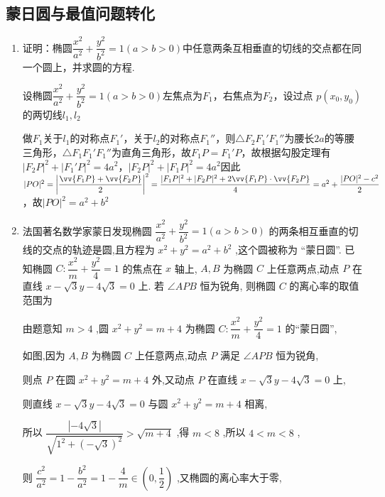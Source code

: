 \subsection*{蒙日圆与最值问题转化}
\begin{enumerate}
    \item 证明：椭圆$\dfrac{x^2}{a^2}+\dfrac{y^2}{b^2} = 1 (a>b>0)$中任意两条互相垂直的切线的交点都在同一个圆上，并求圆的方程.
    \begin{jieda}
        设椭圆$\dfrac{x^2}{a^2}+\dfrac{y^2}{b^2} = 1 (a>b>0)$左焦点为$F_1$，右焦点为$F_2$，设过点 $p\left( {{x}_{0},{y}_{0}}\right)$ 的两切线$l_1, l_2$

        做$F_1$关于$l_1$的对称点$F_1'$，关于$l_2$的对称点$F_1''$，则$\triangle F_2F_1'F_1''$为腰长$2a$的等腰三角形，$\triangle F_1F_1'F_1''$为直角三角形，故$F_1P = F_1'P$，故根据勾股定理有$|F_2P|^2 + |F_1'P|^2 = 4a^2$，$|F_2P|^2 + |F_1P|^2 = 4a^2$因此$|PO|^2 = \left|\dfrac{\vv{F_1P}+\vv{F_2P}}{2}\right|^2 = \dfrac{|F_1P|^2+|F_2P|^2 + 2\vv{F_1P} \cdot \vv{F_2P}}{4} = a^2 + \dfrac{|PO|^2 - c^2}{2}$，故$|PO|^2 = a^2+b^2$  
    \end{jieda}
     \item 法国著名数学家蒙日发现椭圆 $\dfrac{{x}^{2}}{{a}^{2}} + \dfrac{{y}^{2}}{{b}^{2}} = 1\left( {a > b > 0}\right)$ 的两条相互垂直的切线的交点的轨迹是圆,且方程为 ${x}^{2} + {y}^{2} = {a}^{2} + {b}^{2}$ ,这个圆被称为 “蒙日圆”. 已知椭圆 $C : \dfrac{{x}^{2}}{m} + \dfrac{{y}^{2}}{4} = 1$ 的焦点在 $x$ 轴上, $A,B$ 为椭圆 $C$ 上任意两点,动点 $P$ 在直线 $x - \sqrt{3}y - 4\sqrt{3} = 0$ 上. 若 $\angle {APB}$ 恒为锐角, 则椭圆 $C$ 的离心率的取值范围为
    \begin{jieda}
        由题意知 $m > 4$ ,圆 ${x}^{2} + {y}^{2} = m + 4$ 为椭圆 $C : \dfrac{{x}^{2}}{m} + \dfrac{{y}^{2}}{4} = 1$ 的“蒙日圆”,
        
        如图,因为 $A,B$ 为椭圆 $C$ 上任意两点,动点 $P$ 满足 $\angle {APB}$ 恒为锐角,
        
        则点 $P$ 在圆 ${x}^{2} + {y}^{2} = m + 4$ 外,又动点 $P$ 在直线 $x - \sqrt{3}y - 4\sqrt{3} = 0$ 上,
        
        则直线 $x - \sqrt{3}y - 4\sqrt{3} = 0$ 与圆 ${x}^{2} + {y}^{2} = m + 4$ 相离,
        
        所以 $\dfrac{\left| -4\sqrt{3}\right| }{\sqrt{{1}^{2} + {\left( -\sqrt{3}\right) }^{2}}} > \sqrt{m + 4}$ ,得 $m < 8$ ,所以 $4 < m < 8$ ,
        
        则 $\dfrac{{c}^{2}}{{a}^{2}} = 1 - \dfrac{{b}^{2}}{{a}^{2}} = 1 - \dfrac{4}{m} \in  \left( {0,\dfrac{1}{2}}\right)$ ,又椭圆的离心率大于零,
        

\end{jieda}
\end{enumerate}
